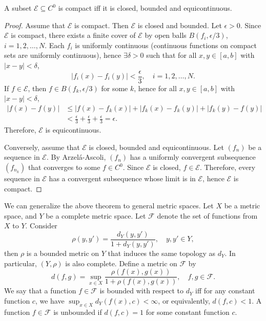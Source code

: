 \begin{thm}
    A subset $\mathcal E \subseteq C^0$ is compact iff it is closed, bounded and equicontinuous.
    \begin{proof}
        Assume that $\mathcal E$ is compact. Then $\mathcal E$ is closed and bounded. Let $\epsilon > 0$. Since $\mathcal E$ is compact, there exists a finite cover of $\mathcal E$ by open balls $B(f_i, \epsilon/3)$, $i = 1, 2, \ldots, N$. Each $f_i$ is uniformly continuous (continuous functions on compact sets are uniformly continuous), hence $\exists \delta > 0$ such that for all $x, y \in [a, b]$ with $|x - y| < \delta$,
        \[
        |f_i(x) - f_i(y)| < \frac{\epsilon}{3}, \quad i = 1, 2, \ldots, N.
        \]
        If $f \in \mathcal E$, then $f \in B(f_k, \epsilon/3)$ for some $k$, hence for all $x, y \in [a, b]$ with $|x - y| < \delta$,
        \begin{align*}
            |f(x) - f(y)| &\leq |f(x) - f_k(x)| + |f_k(x) - f_k(y)| + |f_k(y) - f(y)| \\
            &< \frac{\epsilon}{3} + \frac{\epsilon}{3} + \frac{\epsilon}{3} = \epsilon.
        \end{align*}
        Therefore, $\mathcal E$ is equicontinuous.

        Conversely, assume that $\mathcal E$ is closed, bounded and equicontinuous. Let $(f_n)$ be a sequence in $\mathcal E$. By Arzel\'a-Ascoli, $(f_n)$ has a uniformly convergent subsequence $(f_{n_k})$ that converges to some $f \in C^0$. Since $\mathcal E$ is closed, $f \in \mathcal E$. Therefore, every sequence in $\mathcal E$ has a convergent subsequence whose limit is in $\mathcal E$, hence $\mathcal E$ is compact.
    \end{proof}
\end{thm}

We can generalize the above theorem to general metric spaces. Let $X$ be a metric space, and $Y$ be a complete metric space. Let $\mathcal F$ denote the set of functions from $X$ to $Y$. Consider
\[
\rho(y, y') = \frac{d_Y(y, y')}{1 + d_Y(y, y')}, \quad y, y' \in Y,
\]
then $\rho$ is a bounded metric on $Y$ that induces the same topology as $d_Y$. In particular, $(Y, \rho)$ is also complete. Define a metric on $\mathcal F$ by
\[
d(f, g) = \sup_{x \in X} \frac{\rho(f(x), g(x))}{1 + \rho(f(x), g(x))}, \quad f, g \in \mathcal F.
\]
We say that a function $f \in \mathcal F$ is bounded with respect to $d_Y$ iff for any constant function $c$, we have $\sup_{x \in X} d_Y(f(x), c) < \infty$, or equivalently, $d(f, c) < 1$. A function $f \in \mathcal F$ is unbounded if $d(f, c) = 1$ for some constant function $c$. 


